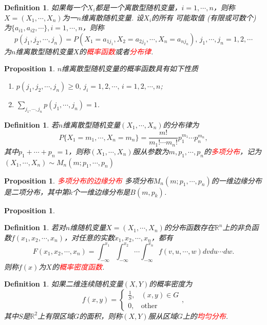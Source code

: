 \documentclass{article}
\newtheorem{proposition}[theorem]{Proposition}
\newtheorem{definition}[theorem]{Definition}
\newcommand{\redt}[1]{\textcolor{red}{#1}}
\begin{document}
\begin{definition}
\rm 如果每一个$X_i$都是一个离散型随机变量，$i = 1,\cdots, n$，则称
$X = (X_1,\cdots, X_n)$为一$n$维离散随机变量. 设$X_i$的所有
可能取值 (有限或可数个) 为$\{a_{i1}, a_{i2}, \cdots \}, i = 1,\cdots, n$，则称
$$
p(j_1,j_2,\cdots,j_n) = P(X_1 = a_{1j_1}, X_2 = a_{2j_2},\cdots,X_n=a_{nj_n}),\, j_1,\cdots,j_n = 1,2,\cdots
$$
为$n$维离散型随机变量$X$的\redt{概率函数}或者\redt{分布律}. 
\end{definition}

\begin{proposition}
\rm $n$维离散型随机变量的概率函数具有如下性质
\begin{enumerate}
	\item $p(j_1,j_2,\cdots,j_n) \geq 0, \, j_i = 1,2,\cdots ,\, i=1,2,\cdots,n$;
	\item $\sum\limits_{j_1,\cdots,j_n} p(j_1,\cdots,j_n)=1$.
\end{enumerate}
\end{proposition}

\begin{definition}
\rm 若$n$维离散型随机变量$(X_1,\cdots,X_n)$的分布律为
$$
P\{X_1 = m_1, \cdots , X_n = m_n\} = \frac{m!}{m_1!\cdots m_n!} p_1^{m_1}\cdots p_n^{m_n},
$$
其中$p_1 + \cdots + p_n = 1$，则称$(X_1,\cdots,X_n)$服从参数为$m,p_1,\cdots,p_n$的\redt{多项分布}，记为$(X_1,\cdots,X_n)\sim M_n(m;p_1,\cdots,p_n)$
\end{definition}

\begin{proposition}
\rm \redt{多项分布的边缘分布} 多项分布$M_n(m;p_1,\cdots,p_n)$的一维边缘分布是二项分布，其中第$k$个一维边缘分布是$B(m,p_k)$. 
\end{proposition}

\begin{proposition}
\rm 
\end{proposition}

\begin{definition}
\rm 若对$n$维随机变量$X = (X_1,\cdots, X_n)$的分布函数存在$\mathbb{R}^n$上的非负函数$f(x_1,x_2,\cdots,x_n)$，对任意的实数$x_1,x_2,\cdots,x_n$，都有
$$
F(x_1,x_2,\cdots,x_n) = \int_{-\infty}^{x_1}\int_{-\infty}^{x_2}\cdots\int_{-\infty}^{x_n}f(v,u,\cdots,w)dvdu\cdots dw.
$$
则称$f(x)$为$X$的\redt{概率密度函数}. 
\end{definition}

\begin{definition}
\rm  如果二维连续随机变量$(X,Y)$的概率密度为
$$
f(x,y) = \left\{\begin{array}{ll}
\frac{1}{S}, & (x,y) \in G\\
0, & \text{other}
\end{array}\right. ,
$$
其中$S$是$\mathbb{R}^2$上有限区域$G$的面积，则称$(X,Y)$服从区域$G$上的\redt{均匀分布}.
\end{definition}
\end{document}

